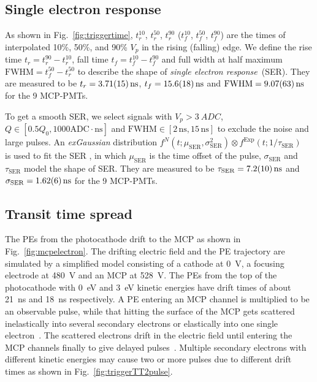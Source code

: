 \subsection{Single electron response}
As shown in Fig.~\ref{fig:triggertime}, $t^{10}_r$, $t^{50}_r$, $t^{90}_r$ ($t^{10}_f$, $t^{50}_f$, $t^{90}_f$) are the times of interpolated 10\%, 50\%, and 90\% $V_p$ in the rising (falling) edge. We define the rise time $t_r = t^{90}_r - t^{10}_r$, fall time $t_f = t^{10}_f - t^{90}_f$ and full width at half maximum $\mathrm{FWHM} = t^{50}_f - t^{50}_r$ to describe the shape of \emph{single electron response}~(SER).  They are measured to be $t_r = \SI{3.71\pm0.15}{ns}$, $t_f = \SI{15.6\pm1.8}{ns}$ and $\mathrm{FWHM} = \SI{9.07\pm0.63}{ns}$ for the 9 MCP-PMTs.

To get a smooth SER, we select signals with $V_p>\SI{3}{ADC}$, $Q \in [0.5Q_0, 1000\mathrm{ADC\cdot ns}]$ and $\mathrm{FWHM} \in [2\,\mathrm{ns}, 15\,\mathrm{ns}]$ to exclude the noise and large pulses. An \emph{exGaussian} distribution $f^N(t;\mu_{\mathrm{SER}},\sigma_\mathrm{SER}^2)\otimes f^{\mathrm{Exp}}(t;1/\tau_\mathrm{SER})$~\cite{Luo:2022xrd} is used to fit the SER%
, in which $\mu_{\mathrm{SER}}$ is the time offset of the pulse, $\sigma_{\mathrm{SER}}$ and $\tau_{\mathrm{SER}}$ model the shape of SER. They are measured to be $\tau_{\mathrm{SER}} = \SI{7.2\pm1.0}{ns}$ and $\sigma_{\mathrm{SER}} = \SI{1.62\pm0.06}{ns}$ for the 9 MCP-PMTs.

\subsection{Transit time spread}
The PEs from the photocathode drift to the MCP as shown in Fig.~\ref{fig:mcpelectron}. The drifting electric field and the PE trajectory are simulated by a simplified model consisting of a cathode at \SI{0}{V}, a focusing electrode at \SI{480}{V} and an MCP at \SI{528}{V}. The PEs from the top of the photocathode with \SI{0}{eV} and \SI{3}{eV} kinetic energies have drift times of about \SI{21}{ns} and \SI{18}{ns} respectively. A PE entering an MCP channel is multiplied to be an observable pulse, while that hitting the surface of the MCP gets scattered inelastically into several secondary electrons or elastically into one single electron~\cite{Furman}. The scattered electrons drift in the electric field until entering the MCP channels finally to give delayed pulses~\cite{KM3NetTesting}. Multiple secondary electrons with different kinetic energies may cause two or more pulses due to different drift times as shown in Fig.~\ref{fig:triggerTT2pulse}.

